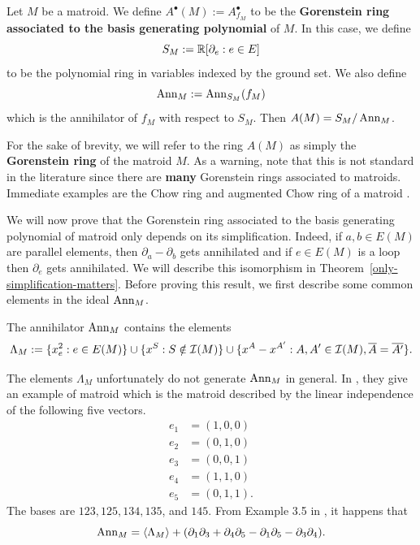 \documentclass{puthesis-UG}
\begin{document}
\begin{defn}
	Let $M$ be a matroid. We define $A^\bullet(M) := A^\bullet_{f_M}$ to be the \textbf{Gorenstein ring associated to the basis generating polynomial} of $M$. In this case, we define 
	\[
		S_M := \mathbb{R} [ \partial_e : e \in E]
	\]
	to be the polynomial ring in variables indexed by the ground set. We also define
	\[
		\operatorname{Ann}_M := \operatorname{Ann}_{S_M}(f_M)
	\]
	which is the annihilator of $f_M$ with respect to $S_M$. Then $A(M) = S_M / \operatorname{Ann}_M$. 
\end{defn}

\begin{remark}
	For the sake of brevity, we will refer to the ring $A(M)$ as simply the \textbf{Gorenstein ring} of the matroid $M$. As a warning, note that this is not standard in the literature since there are \textbf{many} Gorenstein rings associated to matroids. Immediate examples are the Chow ring and augmented Chow ring of a matroid \cite{huh-semi-small}. 
\end{remark}

We will now prove that the Gorenstein ring associated to the basis generating polynomial of matroid only depends on its simplification. Indeed, if $a, b \in E(M)$ are parallel elements, then $\partial_a - \partial_b$ gets annihilated and if $e \in E(M)$ is a loop then $\partial_e$ gets annihilated. We will describe this isomorphism in Theorem~\ref{only-simplification-matters}. Before proving this result, we first describe some common elements in the ideal $\operatorname{Ann}_M$. 

\begin{prop}
	The annihilator $\operatorname{Ann}_M$ contains the elements
	\[
		\Lambda_M := \{x_e^2 : e \in E(M)\} \cup \{x^S : S \notin \mathcal{I} (M)\} \cup \{x^A - x^{A'} : A, A' \in \mathcal{I}(M), \overline{A} = \overline{A'}\}.
	\]
\end{prop}



\begin{example}
	The elements $\Lambda_M$ unfortunately do not generate $\operatorname{Ann}_M$ in general. In \cite{MN-gorenstein}, they give an example of matroid which is the matroid described by the linear independence of the following five vectors. 
	\begin{align*}
	 	e_1 & = (1, 0, 0) \\
	 	e_2 & = (0, 1, 0) \\
	 	e_3 & = (0, 0, 1) \\
	 	e_4 & = (1, 1, 0) \\
	 	e_5 & = (0, 1, 1).
	\end{align*}
	The bases are $123, 125, 134, 135$, and $145$. From Example 3.5 in \cite{MN-gorenstein}, it happens that 
	\[
		\operatorname{Ann}_M = \langle \Lambda_M \rangle + (\partial_1 \partial_3 + \partial_{4} \partial_5 - \partial_1 \partial_5 - \partial_3 \partial_4).
	\]
\end{example}
\end{document}
